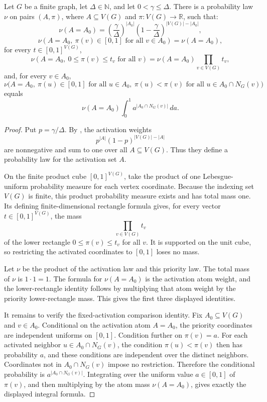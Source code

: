\begin{lemma}
Let \(G\) be a finite graph, let \(\Delta\in\mathbb N\), and let
\(0<\gamma\le\Delta\).  There is a probability law \(\nu\) on pairs
\((A,\pi)\), where \(A\subseteq V(G)\) and \(\pi:V(G)\to\mathbb R\), such
that:
\[
\nu(A=A_0)=
\left(\frac{\gamma}{\Delta}\right)^{|A_0|}
\left(1-\frac{\gamma}{\Delta}\right)^{|V(G)|-|A_0|},
\]
\[
\nu(A=A_0,\ \pi(v)\in[0,1]\text{ for all }v\in A_0)=\nu(A=A_0),
\]
for every \(t\in[0,1]^{V(G)}\),
\[
\nu(A=A_0,\ 0\le \pi(v)\le t_v\text{ for all }v)
=\nu(A=A_0)\prod_{v\in V(G)}t_v,
\]
and, for every \(v\in A_0\),
\[
\nu\bigl(A=A_0,\ \pi(u)\in[0,1]\text{ for all }u\in A_0,\ 
\pi(u)<\pi(v)\text{ for all }u\in A_0\cap N_G(v)\bigr)
\]
equals
\[
\nu(A=A_0)\int_0^1 a^{|A_0\cap N_G(v)|}\,da .
\]
\end{lemma}
\begin{proof}
Put \(p=\gamma/\Delta\).  By
, the activation weights
\[
p^{|A|}(1-p)^{|V(G)|-|A|}
\]
are nonnegative and sum to one over all \(A\subseteq V(G)\).  Thus they define
a probability law for the activation set \(A\).

On the finite product cube \([0,1]^{V(G)}\), take the product of one
Lebesgue-uniform probability measure for each vertex coordinate.  Because the
indexing set \(V(G)\) is finite, this product probability measure exists and
has total mass one.  Its defining finite-dimensional rectangle formula gives,
for every vector \(t\in[0,1]^{V(G)}\), the mass
\[
\prod_{v\in V(G)} t_v
\]
of the lower rectangle \(0\le \pi(v)\le t_v\) for all \(v\).  It is supported
on the unit cube, so restricting the activated coordinates to \([0,1]\) loses
no mass.

Let \(\nu\) be the product of the activation law and this priority law.  The
total mass of \(\nu\) is \(1\cdot1=1\).  The formula for \(\nu(A=A_0)\) is the
activation atom weight, and the lower-rectangle identity follows by
multiplying that atom weight by the priority lower-rectangle mass.  This gives
the first three displayed identities.

It remains to verify the fixed-activation comparison identity.  Fix
\(A_0\subseteq V(G)\) and \(v\in A_0\).  Conditional on the activation atom
\(A=A_0\), the priority coordinates are independent uniforms on \([0,1]\).
Condition further on \(\pi(v)=a\).  For each activated neighbor
\(u\in A_0\cap N_G(v)\), the condition \(\pi(u)<\pi(v)\) then has probability
\(a\), and these conditions are independent over the distinct neighbors.
Coordinates not in \(A_0\cap N_G(v)\) impose no restriction.  Therefore the
conditional probability is \(a^{|A_0\cap N_G(v)|}\).  Integrating over the
uniform value \(a\in[0,1]\) of \(\pi(v)\), and then multiplying by the atom
mass \(\nu(A=A_0)\), gives exactly the displayed integral formula.
\end{proof}
